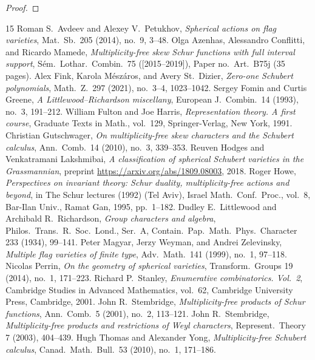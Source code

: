 \documentclass[10pt]{article}
\theoremstyle{definition}
\begin{document}
\begin{proof}
\end{proof}
\begin{thebibliography}{15}
 Roman S.~Avdeev and Alexey V.~Petukhov, \emph{Spherical actions on flag varieties}, Mat.\ Sb.\ 205 (2014), no.~9, 3--48.
 Olga Azenhas, Alessandro Conflitti, and Ricardo Mamede, \emph{Multiplicity-free skew Schur functions with full interval support}, S\'em.\ Lothar.\ Combin.\ 75 ([2015--2019]), Paper no.~Art.\ B75j (35 pages).
 Alex Fink, Karola M\'esz\'aros, and Avery St.\ Dizier, \emph{Zero-one Schubert polynomials}, Math.\ Z.\ 297 (2021), no.~3--4, 1023--1042.
 Sergey Fomin and Curtis Greene, \emph{A Littlewood--Richardson miscellany}, European J.\ Combin.\ 14 (1993), no.~3, 191--212.
 William Fulton and Joe Harris, \emph{Representation theory. A first course}, Graduate Texts in Math., vol.~129, Springer-Verlag, New York, 1991.
 Christian Gutschwager, \emph{On multiplicity-free skew characters and the Schubert calculus}, Ann.\ Comb.\ 14 (2010), no.~3, 339--353.
 Reuven Hodges and Venkatramani Lakshmibai, \emph{A classification of spherical Schubert varieties in the Grassmannian}, preprint \url{https://arxiv.org/abs/1809.08003}, 2018.
 Roger Howe, \emph{Perspectives on invariant theory: Schur duality, multiplicity-free actions and beyond}, in The Schur lectures (1992) (Tel Aviv), Israel Math.\ Conf.\ Proc., vol.~8, Bar-Ilan Univ., Ramat Gan, 1995, pp.~1--182.
 Dudley E.~Littlewood and Archibald R.~Richardson, \emph{Group characters and algebra}, Philos.\ Trans.\ R.\ Soc.\ Lond., Ser.\ A, Contain.\ Pap.\ Math.\ Phys.\ Character 233 (1934), 99--141.
 Peter Magyar, Jerzy Weyman, and Andrei Zelevinsky, \emph{Multiple flag varieties of finite type}, Adv.\ Math.\ 141 (1999), no.~1, 97--118.
 Nicolas Perrin, \emph{On the geometry of spherical varieties}, Transform.\ Groups 19 (2014), no.~1, 171--223.
 Richard P.~Stanley, \emph{Enumerative combinatorics. Vol.~2}, Cambridge Studies in Advanced Mathematics, vol.~62, Cambridge University Press, Cambridge, 2001.
 John R.~Stembridge, \emph{Multiplicity-free products of Schur functions}, Ann.\ Comb.\ 5 (2001), no.~2, 113--121.
 John R.~Stembridge, \emph{Multiplicity-free products and restrictions of Weyl characters}, Represent.\ Theory 7 (2003), 404--439.
 Hugh Thomas and Alexander Yong, \emph{Multiplicity-free Schubert calculus}, Canad.\ Math.\ Bull.\ 53 (2010), no.~1, 171--186.
\end{thebibliography}
\end{document}
